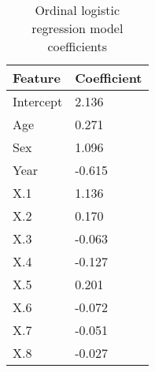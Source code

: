 \documentclass[twocolumn, 8pt]{article}
\begin{document}
\begin{table}[ht]
    \begin{tabular}{|l|l|} \hline
        \textbf{Feature}   & \textbf{Coefficient} \\ \hline
        Intercept & 2.136 \\ \hline
        Age & 0.271 \\ \hline
        Sex & 1.096 \\ \hline
        Year & -0.615 \\ \hline
        X.1 & 1.136 \\ \hline
        X.2 & 0.170 \\ \hline
        X.3 & -0.063 \\ \hline
        X.4 & -0.127 \\ \hline
        X.5 & 0.201 \\ \hline
        X.6 & -0.072 \\ \hline
        X.7 & -0.051 \\ \hline
        X.8 & -0.027 \\ \hline
    \end{tabular}
    \caption{Ordinal logistic regression model coefficients}
    \label{tab:coeff}
\end{table}
\end{document}
